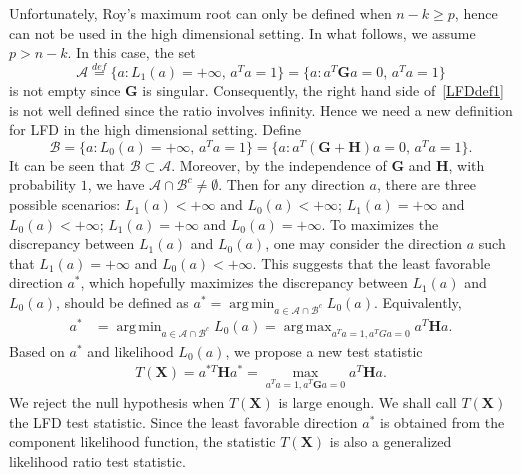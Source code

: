 \documentclass[12pt]{article} %
\DeclareMathOperator*{\argmax}{arg\,max}
\DeclareMathOperator*{\argmin}{arg\,min}
\newcommand{\bX}{\mathbf{X}}
\newcommand{\bH}{\mathbf{H}}
\newcommand{\bG}{\mathbf{G}}
\theoremstyle{definition}
\begin{document}
Unfortunately, Roy's maximum root can only be defined when $n-k\geq p$, hence can not be used in the high dimensional setting.
In what follows, we assume $p>n-k$.
In this case,
the set
$$\mathcal{A}\overset{def}{=}\{a:L_1(a)=+\infty, \, a^T a=1\}=\{a:a^T \bG a=0, \, a^T a=1\}$$
is not empty since $\bG$ is singular. 
Consequently, the right hand side of~\eqref{LFDdef1} is not well defined since the ratio involves infinity.
Hence we need a new definition for LFD in the high dimensional setting.
Define
$$\mathcal{B}=\{a:L_0(a)=+\infty, \, a^T a=1\}=\{a:a^T (\bG+\bH)a= 0, \, a^T a=1\}.$$
It can be seen that $\mathcal{B}\subset \mathcal{A}$.
Moreover, by the independence of $\bG$ and $\bH$, with probability $1$, we have $\mathcal{A}\cap \mathcal{B}^c\neq \emptyset$.
Then for any direction $a$, there are three possible scenarios: $L_1(a)<+\infty$ and $L_0(a)<+\infty$; $L_1(a)=+\infty$ and $L_0(a)<+\infty$; $L_1(a)=+\infty$ and $L_0(a)=+\infty$.
To maximizes the discrepancy between $L_1(a)$ and $L_0(a)$, one may consider the direction $a$ such that $L_1(a)=+\infty$ and $L_0(a)<+\infty$.
This suggests that the least favorable direction $a^*$, which hopefully maximizes the discrepancy between $L_1(a)$ and $L_0(a)$, should be defined as $a^* = \argmin_{a\in\mathcal{A}\cap\mathcal{B}^c} L_0 (a)$.
Equivalently,
$$
\begin{aligned}
    a^*&=\argmin_{a\in \mathcal{A}\cap\mathcal{B}^c} L_0(a) = \argmax_{a^T a=1,a^T Ga=0} {a^T \bH a}.
\end{aligned}
$$
Based on $a^*$ and likelihood $L_0(a)$, we propose a new test statistic
\begin{equation*}
    \begin{aligned}
        T(\bX)=a^{*T} \bH a^*
        =
        \max_{a^T a=1, a^T \bG a=0} 
        a^T \bH a.
    \end{aligned}
\end{equation*}
We reject the null hypothesis when $T(\bX)$ is large enough.
We shall call $T(\bX)$ the LFD test statistic.
Since the least favorable direction $a^*$ is obtained from the component likelihood function, the statistic $T(\bX)$ is also a generalized likelihood ratio test statistic.
\end{document}
